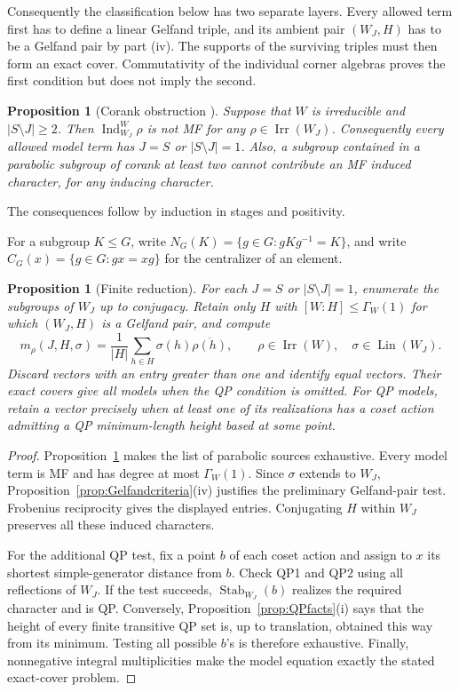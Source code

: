 \documentclass[11pt]{article}
\numberwithin{equation}{section}
\newtheorem{proposition}[theorem]{Proposition}
\theoremstyle{definition}
\DeclareMathOperator{\Ind}{Ind}
\DeclareMathOperator{\Irr}{Irr}
\DeclareMathOperator{\Lin}{Lin}
\DeclareMathOperator{\Stab}{Stab}
\begin{document}
Consequently the classification below has two separate layers.
Every allowed term first has to define a linear Gelfand triple, and its
ambient pair \((W_J,H)\) has to be a Gelfand pair by part (iv).
The supports of the surviving triples must then form an exact cover.
Commutativity of the individual corner algebras proves the first
condition but does not imply the second.

\begin{proposition}[Corank obstruction {\cite[Theorem 1.6]{MZperfect}}]
\label{prop:corank}
Suppose that \(W\) is irreducible and \(|S\setminus J|\geq2\).
Then \(\Ind_{W_J}^W\rho\) is not MF for any \(\rho\in\Irr(W_J)\).
Consequently every allowed model term has \(J=S\) or \(|S\setminus J|=1\).
Also, a subgroup contained in a parabolic subgroup of corank at least two cannot contribute an MF induced character, for any inducing character.
\end{proposition}

The consequences follow by induction in stages and positivity.

For a subgroup \(K\leq G\), write
\(N_G(K)=\{g\in G:gKg^{-1}=K\}\), and write
\(C_G(x)=\{g\in G:gx=xg\}\) for the centralizer of an element.

\begin{proposition}[Finite reduction]\label{prop:finite}
For each \(J=S\) or \(|S\setminus J|=1\), enumerate the subgroups of \(W_J\) up to conjugacy.
Retain only \(H\) with \([W:H]\leq\Gamma_W(1)\) for which \((W_J,H)\) is a Gelfand pair, and compute
\[
 m_\rho(J,H,\sigma)
 =\frac1{|H|}\sum_{h\in H}\sigma(h)\overline{\rho(h)},
 \qquad\rho\in\Irr(W),\quad\sigma\in\Lin(W_J).
\]
Discard vectors with an entry greater than one and identify equal vectors.
Their exact covers give all models when the QP condition is omitted.
For QP models, retain a vector precisely when at least one of its realizations has a coset action admitting a QP minimum-length height based at some point.
\end{proposition}
\begin{proof}
Proposition~\ref{prop:corank} makes the list of parabolic sources exhaustive.
Every model term is MF and has degree at most \(\Gamma_W(1)\).
Since \(\sigma\) extends to \(W_J\), Proposition~\ref{prop:Gelfandcriteria}(iv) justifies the preliminary Gelfand-pair test.
Frobenius reciprocity gives the displayed entries.
Conjugating \(H\) within \(W_J\) preserves all these induced characters.

For the additional QP test, fix a point \(b\) of each coset action and assign to \(x\) its shortest simple-generator distance from \(b\).
Check QP1 and QP2 using all reflections of \(W_J\).
If the test succeeds, \(\Stab_{W_J}(b)\) realizes the required character and is QP.
Conversely, Proposition~\ref{prop:QPfacts}(i) says that the height of every finite transitive QP set is, up to translation, obtained this way from its minimum.
Testing all possible \(b\)'s is therefore exhaustive.
Finally, nonnegative integral multiplicities make the model equation exactly the stated exact-cover problem.
\end{proof}
\end{document}
